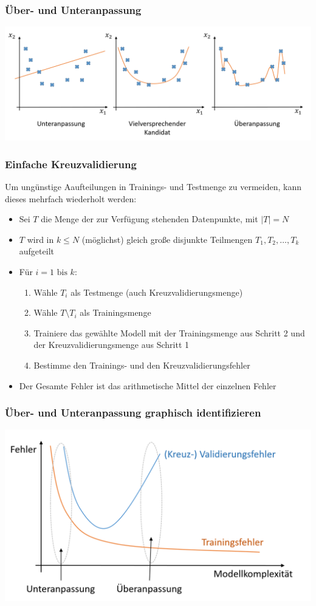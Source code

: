 \begin{frame}
\frametitle{Über- und Unteranpassung}
\includegraphics[scale=0.5]{images/over_under_fitting.PNG} 
\end{frame}
\begin{frame}
\frametitle{Einfache Kreuzvalidierung}
Um ungünstige Aaufteilungen in Trainings- und Testmenge zu vermeiden, kann dieses mehrfach wiederholt werden:
\begin{itemize}[<+->]
\item Sei $T$ die Menge der zur Verfügung stehenden Datenpunkte, mit $|T| = N$
\item $T$ wird in $k\leq N$ (möglichst) gleich große disjunkte Teilmengen $T_1,T_2,\ldots,T_k$ aufgeteilt
\item Für $i = 1 \text{ bis } k$:
\begin{enumerate}[<+->]
\item Wähle $T_i$ als Testmenge (auch Kreuzvalidierungsmenge)
\item Wähle $T \setminus T_i$ als Trainingsmenge
\item Trainiere das gewählte Modell mit der Trainingsmenge aus Schritt 2 und der Kreuzvalidierungsmenge aus Schritt 1
\item Bestimme den Trainings- und den Kreuzvalidierungsfehler
\end{enumerate}
\item Der Gesamte Fehler ist das arithmetische Mittel der einzelnen Fehler 
\end{itemize}
\end{frame}
\begin{frame}
\frametitle{Über- und Unteranpassung graphisch identifizieren}
\centering
\includegraphics[scale=0.4]{images/under-over-fitting2.PNG} 
\end{frame}
